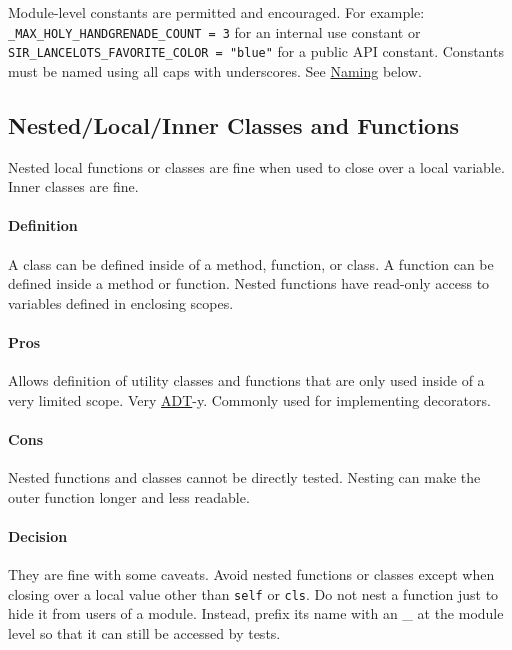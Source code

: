 \documentclass[
]{article}
\begin{document}
Module-level constants are permitted and encouraged. For example:
\texttt{\_MAX\_HOLY\_HANDGRENADE\_COUNT\ =\ 3} for an internal use
constant or \texttt{SIR\_LANCELOTS\_FAVORITE\_COLOR\ =\ "blue"} for a
public API constant. Constants must be named using all caps with
underscores. See \hyperref[s3.16-naming]{Naming} below.

\subsection{Nested/Local/Inner Classes and Functions}

Nested local functions or classes are fine when used to close over a
local variable. Inner classes are fine.

\paragraph{Definition}

A class can be defined inside of a method, function, or class. A
function can be defined inside a method or function. Nested functions
have read-only access to variables defined in enclosing scopes.

\paragraph{Pros}

Allows definition of utility classes and functions that are only used
inside of a very limited scope. Very
\href{https://en.wikipedia.org/wiki/Abstract_data_type}{ADT}-y. Commonly
used for implementing decorators.

\paragraph{Cons}

Nested functions and classes cannot be directly tested. Nesting can make
the outer function longer and less readable.

\paragraph{Decision}

They are fine with some caveats. Avoid nested functions or classes
except when closing over a local value other than \texttt{self} or
\texttt{cls}. Do not nest a function just to hide it from users of a
module. Instead, prefix its name with an \_ at the module level so that
it can still be accessed by tests.
\end{document}
